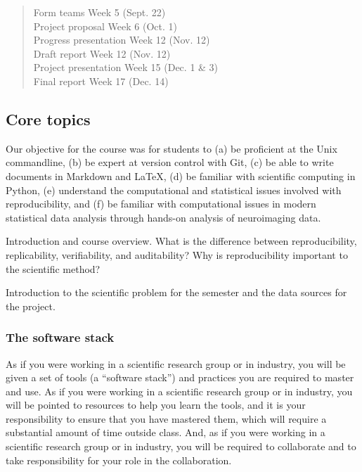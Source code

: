 \begin{quote}
\begin{flushleft}
Form teams \dotfill Week 5 (Sept. 22)\\
Project proposal \dotfill Week 6 (Oct. 1)\\
Progress presentation \dotfill Week 12 (Nov. 12)\\
Draft report \dotfill Week 12 (Nov. 12)\\
Project presentation \dotfill Week 15 (Dec. 1 \& 3)\\
Final report \dotfill Week 17 (Dec. 14)\\
\end{flushleft}
\end{quote}

\subsection{Core topics}

Our objective for the course was for students to
(a) be proficient at the Unix commandline,
(b) be expert at version control with Git,
(c) be able to write documents in Markdown and \LaTeX,
(d) be familiar with scientific computing in Python,
(e) understand the computational and statistical issues involved with reproducibility, and
(f) be familiar with computational issues in modern statistical data
analysis through hands-on analysis of neuroimaging data.


Introduction and course overview. What is the difference between
reproducibility, replicability, verifiability, and auditability? Why is
reproducibility important to the scientific method?

Introduction to the scientific problem for the semester
and the data sources for the project.


\subsubsection{The software stack}

As if you were working in a scientific research group or in industry, you will
be given a set of tools (a ``software stack'') and practices you are required to
master and use. As if you were working in a scientific research group or in
industry, you will be pointed to resources to help you learn the tools, and it
is your responsibility to ensure that you have mastered them, which will
require a substantial amount of time outside class. And, as if you were working
in a scientific research group or in industry, you will be required to
collaborate and to take responsibility for your role in the collaboration.


